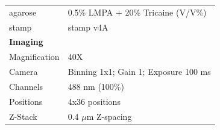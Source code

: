 \documentclass[11pt,singlespacinge,twoside]{reedthesis} %
\begin{document}
\begin{longtable}[]{@{}ll@{}}
\begin{minipage}[t]{0.21\columnwidth}
agarose\strut
\end{minipage} & \begin{minipage}[t]{0.73\columnwidth}\raggedright
0.5\% LMPA + 20\% Tricaine (V/V\%)\strut
\end{minipage}\tabularnewline
\begin{minipage}[t]{0.21\columnwidth}\raggedright
stamp\strut
\end{minipage} & \begin{minipage}[t]{0.73\columnwidth}\raggedright
stamp v4A\strut
\end{minipage}\tabularnewline
\begin{minipage}[t]{0.21\columnwidth}\raggedright
\textbf{Imaging}\strut
\end{minipage} & \begin{minipage}[t]{0.73\columnwidth}\raggedright
\strut
\end{minipage}\tabularnewline
\begin{minipage}[t]{0.21\columnwidth}\raggedright
Magnification\strut
\end{minipage} & \begin{minipage}[t]{0.73\columnwidth}\raggedright
40X\strut
\end{minipage}\tabularnewline
\begin{minipage}[t]{0.21\columnwidth}\raggedright
Camera\strut
\end{minipage} & \begin{minipage}[t]{0.73\columnwidth}\raggedright
Binning 1x1; Gain 1; Exposure 100 ms\strut
\end{minipage}\tabularnewline
\begin{minipage}[t]{0.21\columnwidth}\raggedright
Channels\strut
\end{minipage} & \begin{minipage}[t]{0.73\columnwidth}\raggedright
488 nm (100\%)\strut
\end{minipage}\tabularnewline
\begin{minipage}[t]{0.21\columnwidth}\raggedright
Positions\strut
\end{minipage} & \begin{minipage}[t]{0.73\columnwidth}\raggedright
4x36 positions\strut
\end{minipage}\tabularnewline
\begin{minipage}[t]{0.21\columnwidth}\raggedright
Z-Stack\strut
\end{minipage} & \begin{minipage}[t]{0.73\columnwidth}\raggedright
0.4 \(\mu\)m Z-spacing\strut
\end{minipage}\tabularnewline
\bottomrule
\end{longtable}
\end{document}
